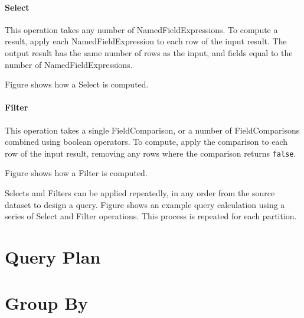 \paragraph{Select} 
This operation takes any number of NamedFieldExpressions. To compute a result, apply each NamedFieldExpression to each row of the input result. The output result has the same number of rows as the input, and fields equal to the number of NamedFieldExpressions. 

Figure  shows how a Select is computed.


\paragraph{Filter}
This operation takes a single FieldComparison, or a number of FieldComparisons combined using boolean operators. To compute, apply the comparison to each row of the input result, removing any rows where the comparison returns \texttt{false}.

Figure  shows how a Filter is computed.


Selects and Filters can be applied repeatedly, in any order from the source dataset to design a query. Figure  shows an example query calculation using a series of Select and Filter operations. This process is repeated for each partition.

	
\section{Query Plan}


\section{Group By}

